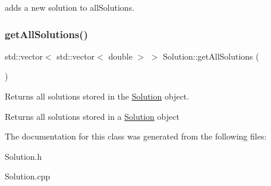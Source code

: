 adds a new solution to all\+Solutions. \mbox{\label{class_solution_abd28abd062adb793866fd5e1c8ef8639}} 
\subsubsection{\texorpdfstring{get\+All\+Solutions()}{getAllSolutions()}}
{\footnotesize\ttfamily std\+::vector$<$ std\+::vector$<$ double $>$ $>$ Solution\+::get\+All\+Solutions (\begin{DoxyParamCaption}{ }\end{DoxyParamCaption})}

Returns all solutions stored in the \hyperlink{class_solution}{Solution} object.

Returns all solutions stored in a \hyperlink{class_solution}{Solution} object 

The documentation for this class was generated from the following files\+:\begin{DoxyCompactItemize}
\item 
Solution.\+h\item 
Solution.\+cpp\end{DoxyCompactItemize}
